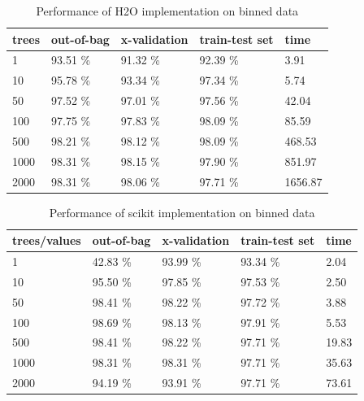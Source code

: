 \documentclass[thesis=B,english]{FITthesis}[2012/10/20]
\begin{document}
\begin{table}[h]
\begin{tabular}{|l|l|l|l|l|}
\hline
trees        & out-of-bag & x-validation & train-test set & time \\ \hline
1            &93.51 \%            &91.32 \%              &92.39 \%                 & 3.91        \\ \hline
10           &95.78 \%            &93.34 \%              &97.34   \%                 & 5.74       \\ \hline
50           &97.52 \%            &97.01 \%              &97.56 \%                 & 42.04      \\ \hline
100          &97.75 \%            &97.83 \%              &98.09 \%                 & 85.59      \\ \hline
500          &98.21 \%            &98.12 \%              &98.09 \%                 & 468.53    \\ \hline
1000         &98.31 \%            &98.15 \%               &97.90 \%                 & 851.97        \\ \hline
2000         &98.31 \%            &98.06 \%              &97.71 \%                 & 1656.87       \\ \hline
\end{tabular}
\caption{Performance of H2O implementation on binned data}
\label{tab:h2o-binned}
\end{table}
\begin{table}[h]
\begin{tabular}{|l|l|l|l|l|}
\hline
trees/values & out-of-bag & x-validation & train-test set & time \\ \hline
1            &42.83 \%           &93.99 \%              &93.34 \%                & 2.04          \\ \hline
10           &95.50 \%           &97.85 \%              &97.53 \%                &2.50           \\ \hline
50           &98.41 \%           &98.22 \%              &97.72 \%                &3.88        \\ \hline
100          &98.69 \%           &98.13 \%              &97.91 \%                &5.53        \\ \hline
500          &98.41 \%           &98.22 \%              &97.71 \%                &19.83      \\ \hline
1000         &98.31 \%           &98.31 \%              &97.71 \%                &35.63         \\ \hline
2000         &94.19 \%           &93.91 \%              &97.71 \%                &73.61        \\ \hline
\end{tabular}
\caption{Performance of scikit implementation on binned data}
\label{tab:scikit-binned}
\end{table}
\end{document}
